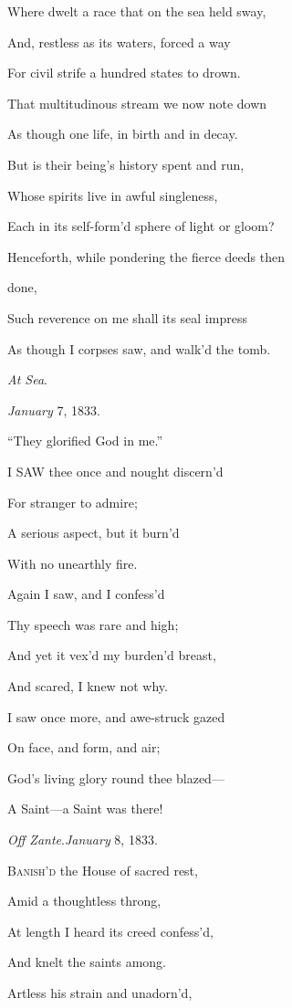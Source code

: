 Where dwelt a race that on the sea held sway,

And, restless as its waters, forced a way

For civil strife a hundred states to drown.

That multitudinous stream we now note down

As though one life, in birth and in decay.

But is their being's history spent and run,

Whose spirits live in awful singleness,

Each in its self-form'd sphere of light or gloom?

Henceforth, while pondering the fierce deeds then

done,

Such reverence on me shall its seal impress

As though I corpses saw, and walk'd the tomb.

\emph{At Sea}.

\emph{January} 7, 1833.


``They glorified God in me.''

I SAW thee once and nought discern'd

For stranger to admire;

A serious aspect, but it burn'd

With no unearthly fire.

Again I saw, and I confess'd

Thy speech was rare and high;

And yet it vex'd my burden'd breast,

And scared, I knew not why.

I saw once more, and awe-struck gazed

On face, and form, and air;

God's living glory round thee blazed—

A Saint—a Saint was there!

\emph{Off Zante}.\emph{January} 8, 1833.


B\textsc{anish'd} the House of sacred rest,

Amid a thoughtless throng,

At length I heard its creed confess'd,

And knelt the saints among.

Artless his strain and unadorn'd,

